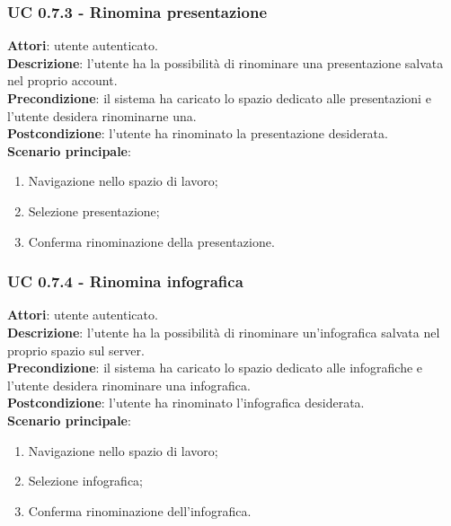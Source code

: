 	\subsubsection{UC 0.7.3 - Rinomina presentazione}{
		\label{uc0.7.3}
		\textbf{Attori}: utente autenticato.	\\
		\textbf{Descrizione}: l'utente ha la possibilità di rinominare una presentazione salvata nel proprio account. \\
		\textbf{Precondizione}: il sistema ha caricato lo spazio dedicato alle presentazioni e l'utente desidera rinominarne una.	\\
		\textbf{Postcondizione}: l'utente ha rinominato la presentazione desiderata.	\\
		\textbf{Scenario principale}:
		\begin{enumerate}
			\item Navigazione nello spazio di lavoro;
			\item Selezione presentazione;
			\item Conferma rinominazione della presentazione.
		\end{enumerate}
		}
	\subsubsection{UC 0.7.4 - Rinomina infografica}{
		\label{uc0.7.4}
		\textbf{Attori}: utente autenticato.	\\
		\textbf{Descrizione}: l'utente ha la possibilità di rinominare un'infografica salvata nel proprio spazio sul server. \\
		\textbf{Precondizione}: il sistema ha caricato lo spazio dedicato alle infografiche e l'utente desidera rinominare una infografica.	\\
		\textbf{Postcondizione}: l'utente ha rinominato l'infografica desiderata.	\\
		\textbf{Scenario principale}:
		\begin{enumerate}
			\item Navigazione nello spazio di lavoro;
			\item Selezione infografica;
			\item Conferma rinominazione dell'infografica.
		\end{enumerate}
		}
